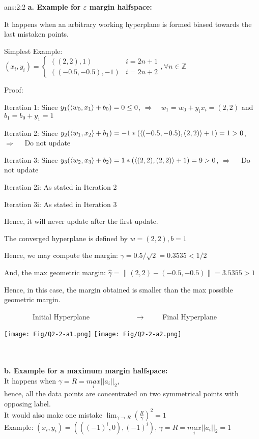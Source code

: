 \documentclass{tron}
\begin{document}
\newpage
\begin{answer}[Margin]{ans:2:2}
	\textbf{a. Example for $\varepsilon$ margin halfspace:}\\
	{
		It happens when an arbitrary working hyperplane is formed biased towards the last mistaken points. 
		
		Simplest Example: \\
		$(x_i, y_i) = \begin{cases} ((2, 2), 1) & i = 2n + 1 \\ ((-0.5, -0.5), -1) & i = 2n + 2 \end{cases}, \forall n \in \mathbb{Z}$
				
		
		Proof:
		
		Iteration 1: Since $y_1(\langle w_0, x_1 \rangle + b_0) = 0 \leq 0$, $\Rightarrow \quad w_1 = w_0 + y_i x_i = (2,2)$ and $b_1 = b_0 + y_1 = 1$
		
		Iteration 2: Since $y_2(\langle w_1, x_2 \rangle + b_1) = -1 * (\langle (-0.5,-0.5), (2,2) \rangle + 1) = 1 > 0$, $\Rightarrow \quad$ Do not update
		
		Iteration 3: Since $y_3(\langle w_2, x_3 \rangle + b_2) = 1 * (\langle (2,2), (2,2) \rangle + 1) = 9 > 0$, $\Rightarrow \quad$ Do not update
		
		Iteration 2i: As stated in Iteration 2

		Iteration 3i: As stated in Iteration 3
		
		Hence, it will never update after the first update.
		
		The converged hyperplane is defined by $w=(2,2), b=1$
		
		Hence, we may compute the margin: $\gamma = 0.5/\sqrt{2} = 0.3535 < 1/2 $
		
		And, the max geometric margin: $\hat{\gamma} =  \| (2,2) - (-0.5,-0.5)\| = 3.5355 > 1$
		
		Hence, in this case, the margin obtained is smaller than the max possible geometric margin.
		
		$\qquad\qquad$Initial Hyperplane $\qquad\qquad\qquad\rightarrow\qquad$  Final Hyperplane
		
		\texttt{[image: Fig/Q2-2-a1.png]}
		\texttt{[image: Fig/Q2-2-a2.png]}
	}
	\\\\
	\clearpage
	\textbf{b. Example for a maximum margin halfspace:}\\
	{
		It happens when $\gamma = R = \underset{i}{max}||a_i||_2$,\\
		hence, all the data points are concentrated on two symmetrical points with opposing label. \\
		It would also make one mistake $\lim_{\gamma \rightarrow R}(\frac{R}{\gamma})^2 = 1$ \\
		Example: $(x_i, y_i) = (((-1)^{i}, 0), (-1)^{i})$, $\gamma = R = \underset{i}{max}||a_i||_2 = 1$\\
		
}
\end{answer}
\end{document}

